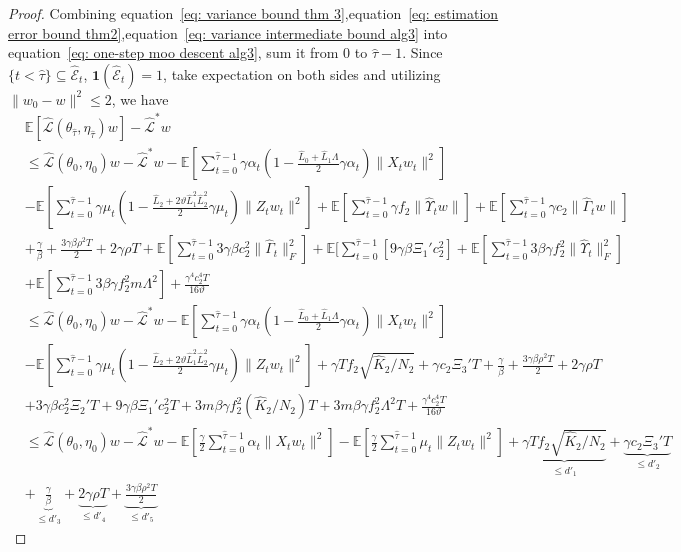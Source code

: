 \documentclass[twoside]{article} %
\def\eqref#1{equation~\ref{#1}}
\theoremstyle{plain}
\theoremstyle{definition}
\theoremstyle{remark}
\newcommand{\HGamma}{\hat{\Gamma}}
\newcommand{\HUpsilon}{\hat{\Upsilon}}
\newcommand{\hL}{\hat{L}}
\newcommand{\htau}{\hat{\tau}}
\newcommand{\fhL}{\hat{\mathcal{L}}}
\newcommand{\calhatE}{\mathcal{\hat{E}}}
\begin{document}
\begin{proof}
Combining \eqref{eq: variance bound thm 3},\eqref{eq: estimation error bound thm2},\eqref{eq: variance intermediate bound alg3} into \eqref{eq: one-step moo descent alg3}, sum it from $0$ to $\htau-1$. Since $\{t< \htau\}\subseteq \calhatE_t$, $\mathbf{1}(\calhatE_t)=1$, {take expectation on both sides} and utilizing $\|w_0-w\|^2\leq 2$, we have
\begin{align}
    &\mathbb{E}[\fhL(\theta_{\htau},\eta_{\htau})w]-\fhL^*w\nonumber\\
    &\leq \fhL(\theta_0,\eta_0)w-\fhL^*w-\mathbb{E}[\sum_{t=0}^{\htau-1}\gamma\alpha_t(1-\frac{\hL_0+\hL_1\Lambda}{2}\gamma\alpha_t)\|X_tw_t\|^2]\nonumber\\
    & -\mathbb{E}[\sum_{t=0}^{\htau-1}\gamma\mu_t(1-\frac{\hL_2+2\vartheta\hL_1^2\hL_2^2}{2}\gamma\mu_t)\|Z_tw_t\|^2] +\mathbb{E}[\sum_{t=0}^{\htau-1}\gamma{f_2}\|\HUpsilon_tw\|]+\mathbb{E}[\sum_{t=0}^{\htau-1}\gamma  c_2\| \HGamma_tw\|]\nonumber\\
    &+\frac{\gamma}{\beta}+\frac{3\gamma\beta\rho^2T}{2}
    +2\gamma\rho T + \mathbb{E}[\sum_{t=0}^{\htau-1}3\gamma\beta c_2^2\|\HGamma_t\|_F^2] + \mathbb{E}[\sum_{t=0}^{\htau-1}[9\gamma\beta\Xi_1'c_2^2]+ \mathbb{E}[\sum_{t=0}^{\htau-1}3\beta\gamma{f_2^2}\|\HUpsilon_t\|_F^2]\nonumber\\
    &+\mathbb{E}[\sum_{t=0}^{\htau-1}3\beta\gamma{f_2^2}m\Lambda^2]+ \frac{\gamma^4c_2^4T}{16\vartheta}\nonumber\\
    &\leq \fhL(\theta_0,\eta_0)w-\fhL^*w-\mathbb{E}[\sum_{t=0}^{\htau-1}\gamma\alpha_t(1-\frac{\hL_0+\hL_1\Lambda}{2}\gamma\alpha_t)\|X_tw_t\|^2] \nonumber\\
    &-\mathbb{E}[\sum_{t=0}^{\htau-1}\gamma\mu_t(1-\frac{\hL_2+2\vartheta\hL_1^2\hL_2^2}{2}\gamma\mu_t)\|Z_tw_t\|^2]+\gamma T{f_2}\sqrt{\hat{K}_2/N_2}+\gamma c_2\Xi_3'T+\frac{\gamma}{\beta}+\frac{3\gamma\beta\rho^2T}{2} +2\gamma\rho T\nonumber\\
    &
    + 3\gamma\beta c_2^2\Xi_2' T + 9\gamma\beta\Xi_1'c_2^2 T+ 3m\beta\gamma{f_2^2}(\hat{K}_2/N_2)T+3m\beta\gamma{f_2^2}\Lambda^2T + \frac{\gamma^4c_2^4T}{16\vartheta}\nonumber\\
    &\leq \fhL(\theta_0,\eta_0)w-\fhL^*w-\mathbb{E}[\frac{\gamma}{2}\sum_{t=0}^{\htau-1}\alpha_t\|X_tw_t\|^2] -\mathbb{E}[\frac{\gamma}{2}\sum_{t=0}^{\htau-1}\mu_t\|Z_tw_t\|^2] +\underbrace{\gamma T{f_2}\sqrt{\hat{K}_2/N_2}}_{\leq d'_1}+\underbrace{\gamma c_2\Xi_3'T}_{\leq d'_2}\nonumber\\
    &+\underbrace{\frac{\gamma}{\beta}}_{\leq d'_3}+\underbrace{2\gamma\rho T}_{\leq d'_4}+\underbrace{\frac{3\gamma\beta\rho^2T}{2}}_{\leq d'_5} 

\end{align}
\end{proof}
\end{document}
